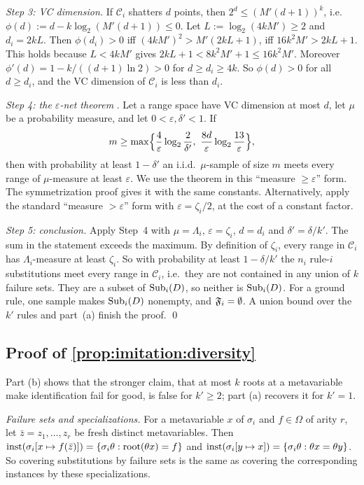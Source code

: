 \emph{Step 3: VC dimension.} If $\mathcal C_i$ shatters $d$ points, then $2^d\le(M'(d+1))^k$, i.e.\ $\phi(d):=d-k\log_2(M'(d+1))\le0$. Let $L:=\log_2(4kM')\ge2$ and $d_i=2kL$. Then $\phi(d_i)>0$ iff $(4kM')^2>M'(2kL+1)$, iff $16k^2M'>2kL+1$. This holds because $L<4kM'$ gives $2kL+1<8k^2M'+1\le16k^2M'$. Moreover $\phi'(d)=1-k/((d+1)\ln2)>0$ for $d\ge d_i\ge4k$. So $\phi(d)>0$ for all $d\ge d_i$, and the VC dimension of $\mathcal C_i$ is less than $d_i$.

\emph{Step 4: the $\varepsilon$-net theorem} \citep{haussler1987epsilon,blumer1989learnability}. Let a range space have VC dimension at most $d$, let $\mu$ be a probability measure, and let $0<\varepsilon,\delta'<1$. If
\[
m\ge\max\Bigl\{\frac4\varepsilon\log_2\frac2{\delta'},\ \frac{8d}\varepsilon\log_2\frac{13}\varepsilon\Bigr\},
\]
then with probability at least $1-\delta'$ an i.i.d.\ $\mu$-sample of size $m$ meets every range of $\mu$-measure at least $\varepsilon$. We use the theorem in this ``measure $\ge\varepsilon$'' form. The symmetrization proof gives it with the same constants. Alternatively, apply the standard ``measure $>\varepsilon$'' form with $\varepsilon=\zeta_i/2$, at the cost of a constant factor.

\emph{Step 5: conclusion.} Apply Step~4 with $\mu=\Lambda_i$, $\varepsilon=\zeta_i$, $d=d_i$ and $\delta'=\delta/k'$. The sum in the statement exceeds the maximum. By definition of $\zeta_i$, every range in $\mathcal C_i$ has $\Lambda_i$-measure at least $\zeta_i$. So with probability at least $1-\delta/k'$ the $n_i$ rule-$i$ substitutions meet every range in $\mathcal C_i$, i.e.\ they are not contained in any union of $k$ failure sets. They are a subset of $\mathrm{Sub}_i(D)$, so neither is $\mathrm{Sub}_i(D)$. For a ground rule, one sample makes $\mathrm{Sub}_i(D)$ nonempty, and $\mathfrak F_i=\emptyset$. A union bound over the $k'$ rules and part~(a) finish the proof. \qed

\subsection{Proof of \texorpdfstring{\cref{prop:imitation:diversity}}{the low-variety proposition}}\label{app:imitation:diversity}

Part (b) shows that the stronger claim, that at most $k$ roots at a metavariable make identification fail for good, is false for $k'\ge2$; part (a) recovers it for $k'=1$.

\emph{Failure sets and specializations.} For a metavariable $x$ of $\sigma_i$ and $f\in\Omega$ of arity $r$, let $\bar z=z_1,\dots,z_r$ be fresh distinct metavariables. Then $\mathrm{inst}(\sigma_i[x\mapsto f(\bar z)])=\{\sigma_i\theta:\mathrm{root}(\theta x)=f\}$ and $\mathrm{inst}(\sigma_i[y\mapsto x])=\{\sigma_i\theta:\theta x=\theta y\}$. So covering substitutions by failure sets is the same as covering the corresponding instances by these specializations.


